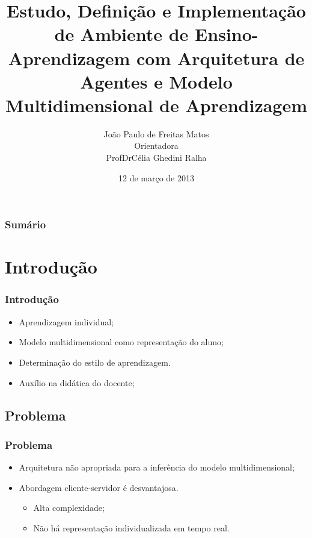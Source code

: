 \documentclass{beamer}
\title{Estudo, Definição e Implementação de Ambiente de Ensino-Aprendizagem com Arquitetura de Agentes e Modelo Multidimensional de Aprendizagem}
\author{João Paulo de Freitas Matos\\{\small Orientadora\\ Prof\textordfeminine Dr\textordfeminine Célia Ghedini Ralha}}
\institute[UnB]
{
    {\Large Universidade de Brasília}\\
    {\small
    Instituto de Ciências Exatas\\
    Departamento de Ciência da Computação}



}
\date{12 de março de 2013}
\begin{document}
\begin{frame}
\titlepage
\end{frame}


\begin{frame}
	\frametitle{Sumário}
	\tableofcontents
\end{frame}


\section{Introdução}
\begin{frame}
    \frametitle{Introdução}
       \begin{itemize}
	\item Aprendizagem individual;
	\item Modelo multidimensional como representação do aluno;
	\item Determinação do estilo de aprendizagem.
	\item Auxílio na didática do docente;
    \end{itemize}
\end{frame}


\subsection{Problema}
\begin{frame}
    \frametitle{Problema}
    \begin{itemize}
	\item Arquitetura não apropriada para a inferência do modelo multidimensional;
	\item Abordagem cliente-servidor é desvantajosa.
	\begin{itemize}
		\item Alta complexidade;
		\item Não há representação individualizada em tempo real.
	\end{itemize}
    \end{itemize}
\end{frame}

\end{document}

